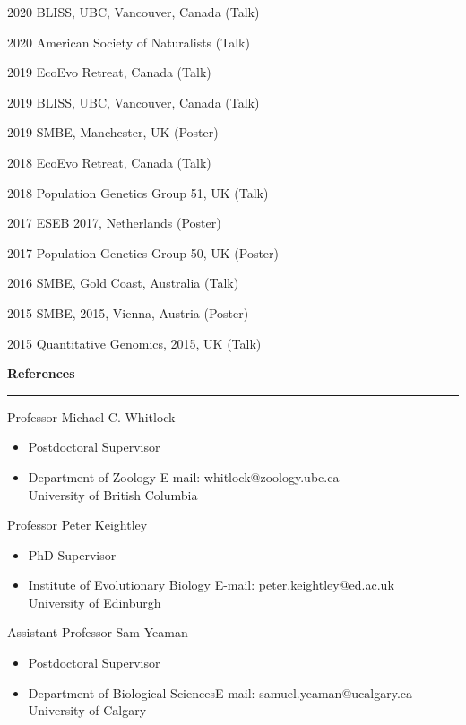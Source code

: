 \documentclass[11pt]{article}
\newcommand{\makeheadingGeneric}[2][]%
        {\hspace*{-\marginparsep minus \marginparwidth}%
         \begin{minipage}[t]{\textwidth+\marginparwidth+\marginparsep}%
             {\large \bfseries #2 \hfill #1}\\[-0.15\baselineskip]%
                 \rule{\columnwidth}{1pt}%
         \end{minipage}}
\newenvironment{innerlist}[1][\enskip\textbullet]%
        {\begin{itemize}[#1,leftmargin=*,parsep=0pt,itemsep=0pt,topsep=0pt,partopsep=0pt]}
        {\end{itemize}}
\newcommand{\blankline}{\quad\pagebreak[2]}
\newcommand{\halfblankline}{\quad\vspace{-0.3\baselineskip}\pagebreak[2]}
\begin{document}
2020 \quad BLISS, UBC, Vancouver, Canada (Talk) 

2020 \quad American Society of Naturalists (Talk) 

2019 \quad EcoEvo Retreat, Canada (Talk)

2019 \quad BLISS, UBC, Vancouver, Canada (Talk) 

2019 \quad SMBE, Manchester, UK (Poster)

2018 \quad EcoEvo Retreat, Canada (Talk)

2018 \quad Population Genetics Group 51, UK (Talk)

2017 \quad ESEB 2017, Netherlands (Poster)

2017 \quad Population Genetics Group 50, UK (Poster) 

2016 \quad SMBE, Gold Coast, Australia (Talk)

2015 \quad SMBE, 2015, Vienna, Austria (Poster) 

2015 \quad Quantitative Genomics, 2015, UK (Talk)

\newpage
	

\makeheadingGeneric{References}

\blankline

Professor Michael C. Whitlock
\begin{innerlist}
\item[] Postdoctoral Supervisor
\item[] Department of Zoology \hfill{E-mail: whitlock@zoology.ubc.ca}\\
University of British Columbia 
\end{innerlist}

\halfblankline

Professor Peter Keightley
\begin{innerlist}
\item[] PhD Supervisor
\item[]  Institute of Evolutionary Biology \hfill{E-mail: peter.keightley@ed.ac.uk}\\
University of Edinburgh
\end{innerlist}

\halfblankline

Assistant Professor Sam Yeaman
\begin{innerlist}
\item[] Postdoctoral Supervisor
\item[]   Department of Biological Sciences\hfill{E-mail: samuel.yeaman@ucalgary.ca}\\
University of Calgary
\end{innerlist}
\end{document}

